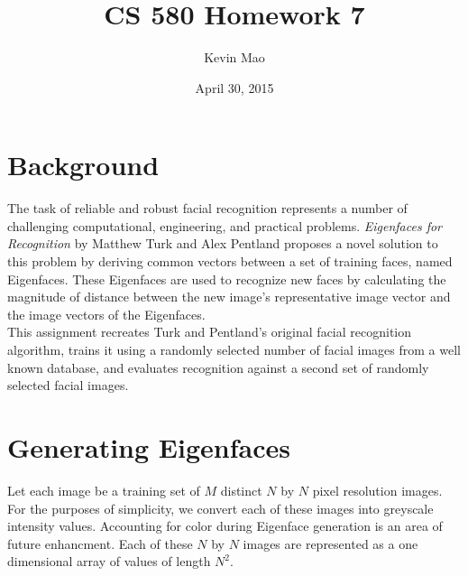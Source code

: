 \documentclass[11pt]{article}
\begin{document}
\title{CS 580 Homework 7}
\author{Kevin Mao}
\date{April 30, 2015}
\maketitle

\section*{Background}

The task of reliable and robust facial recognition represents a number of challenging computational, engineering, and practical problems. \textit{Eigenfaces for Recognition} by Matthew Turk and Alex Pentland proposes a novel solution to this problem by deriving common vectors between a set of training faces, named Eigenfaces. These Eigenfaces are used to recognize new faces by calculating the magnitude of distance between the new image's representative image vector and the image vectors of the Eigenfaces.\\

\noindent
This assignment recreates Turk and Pentland's original facial recognition algorithm, trains it using a randomly selected number of facial images from a well known database, and evaluates recognition against a second set of randomly selected facial images.

\section*{Generating Eigenfaces}
Let each image be a training set of $M$ distinct $N$ by $N$ pixel resolution images. For the purposes of simplicity, we convert each of these images into greyscale intensity values. Accounting for color during Eigenface generation is an area of future enhancment. Each of these $N$ by $N$ images are represented as a one dimensional array of values of length $N^2$. 
\end{document}
